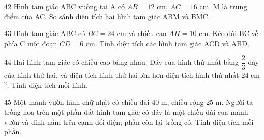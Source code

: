 \gap
\begin{probbox}{42}{}
Hình tam giác ABC vuông tại A có $AB=12$ cm, $AC=16$ cm. M là trung điểm của AC. So sánh diện tích hai hình tam giác ABM và BMC.
\end{probbox}
\gap
\begin{probbox}{43}{}
Hình tam giác ABC có $BC=24$ cm và chiều cao $AH=10$ cm. Kéo dài BC về phía C một đoạn $CD=6$ cm. Tính diện tích các hình tam giác ACD và ABD.
\end{probbox}
\gap
\begin{probbox}{44}{}
Hai hình tam giác có chiều cao bằng nhau. Đáy của hình thứ nhất bằng $\dfrac23$ đáy của hình thứ hai, và diện tích hình thứ hai lớn hơn diện tích hình thứ nhất $24$ cm$^2$. Tính diện tích mỗi hình.
\end{probbox}
\gap
\begin{probbox}{45}{}
Một mảnh vườn hình chữ nhật có chiều dài $40$ m, chiều rộng $25$ m. Người ta trồng hoa trên một phần đất hình tam giác có đáy là một chiều dài của mảnh vườn và đỉnh nằm trên cạnh đối diện; phần còn lại trồng cỏ. Tính diện tích mỗi phần.
\end{probbox}
